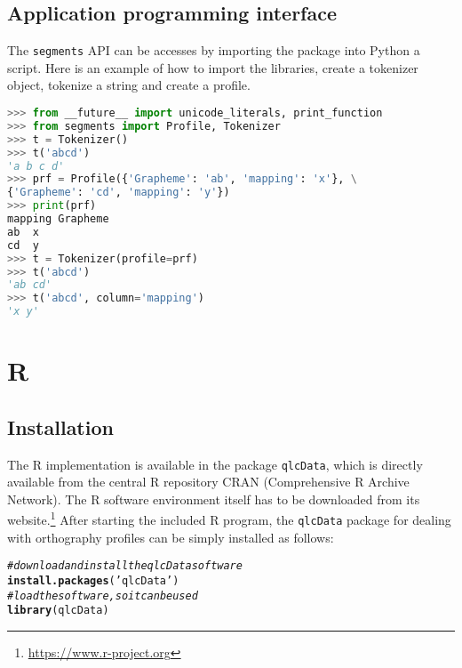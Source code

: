 \documentclass[output=inprep,
		biblatex
		]{LSP/langsci}\usepackage[]{graphicx}\usepackage[]{color}
\makeatletter
\newcommand{\hlstr}[1]{\textcolor[rgb]{0.192,0.494,0.8}{#1}}%
\newcommand{\hlcom}[1]{\textcolor[rgb]{0.678,0.584,0.686}{\textit{#1}}}%
\newcommand{\hlstd}[1]{\textcolor[rgb]{0.345,0.345,0.345}{#1}}%
\newcommand{\hlkwd}[1]{\textcolor[rgb]{0.737,0.353,0.396}{\textbf{#1}}}%
\newenvironment{kframe}{%
 \def\at@end@of@kframe{}%
 \ifinner\ifhmode%
  \def\at@end@of@kframe{\end{minipage}}%
  \begin{minipage}{\columnwidth}%
 \fi\fi%
 \def\FrameCommand##1{\hskip\@totalleftmargin \hskip-\fboxsep
 \colorbox{shadecolor}{##1}\hskip-\fboxsep
     \hskip-\linewidth \hskip-\@totalleftmargin \hskip\columnwidth}%
 \MakeFramed {\advance\hsize-\width
   \@totalleftmargin\z@ \linewidth\hsize
   \@setminipage}}%
 {\par\unskip\endMakeFramed%
 \at@end@of@kframe}
\newenvironment{knitrout}{}{} %
\makeatother
\begin{document}
\subsection*{Application programming interface}
The \texttt{segments} API can be accesses by importing 
the package into Python a script. Here is an example of 
how to import the libraries, create a tokenizer object, 
tokenize a string and create a profile.

\begin{lstlisting}[language=python]
>>> from __future__ import unicode_literals, print_function
>>> from segments import Profile, Tokenizer
>>> t = Tokenizer()
>>> t('abcd')
'a b c d'
>>> prf = Profile({'Grapheme': 'ab', 'mapping': 'x'}, \
{'Grapheme': 'cd', 'mapping': 'y'})
>>> print(prf)
mapping Grapheme
ab  x
cd  y
>>> t = Tokenizer(profile=prf)
>>> t('abcd')
'ab cd'
>>> t('abcd', column='mapping')
'x y'
\end{lstlisting}


\section{R}
\label{r-implementation}

\subsection*{Installation}

The R implementation is available in the package \texttt{qlcData}, which is 
directly available from the central R repository CRAN (Comprehensive R Archive 
Network). The R software environment itself has to be downloaded from its 
website.\footnote{\url{https://www.r-project.org}} After starting the included 
R program, the \texttt{qlcData} package for dealing with orthography profiles can be 
simply installed as follows:

\begin{knitrout}\footnotesize
{}\color{fgcolor}\begin{kframe}
\begin{alltt}
\hlcom{# download and install the qlcData software}
\hlkwd{install.packages}\hlstd{(}\hlstr{'qlcData'}\hlstd{)}
\hlcom{# load the software, so it can be used}
\hlkwd{library}\hlstd{(qlcData)}
\end{alltt}
\end{kframe}
\end{knitrout}
\end{document}
